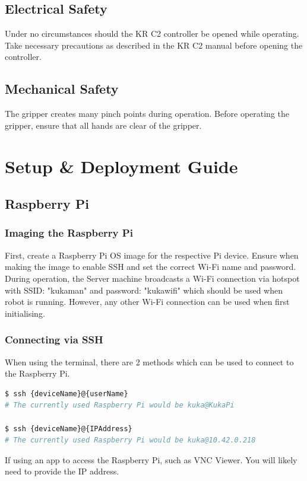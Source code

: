 \documentclass{ol-softwaremanual}
\begin{document}
\subsection{Electrical Safety}
Under no circumstances should the KR C2 controller be opened while operating. Take necessary precautions as described in the KR C2 manual before opening the controller.

\subsection{Mechanical Safety}
The gripper creates many pinch points during operation. Before operating the gripper, ensure that all hands are clear of the gripper.

\section{Setup \& Deployment Guide}
\subsection{Raspberry Pi}

\subsubsection{Imaging the Raspberry Pi}
First, create a Raspberry Pi OS image for the respective Pi device. Ensure when making the image to enable SSH and set the correct Wi-Fi name and password. During operation, the Server machine broadcasts a Wi-Fi connection via hotspot with SSID: "kukaman" and password: "kukawifi" which should be used when robot is running. However, any other Wi-Fi connection can be used when first initialising.

\subsubsection{Connecting via SSH}
When using the terminal, there are 2 methods which can be used to connect to the Raspberry Pi.
\begin{lstlisting}[language=bash, caption="How to SSH into a Raspberry Pi"]
$ ssh {deviceName}@{userName}
# The currently used Raspberry Pi would be kuka@KukaPi

$ ssh {deviceName}@{IPAddress} 
# The currently used Raspberry Pi would be kuka@10.42.0.218
\end{lstlisting}

If using an app to access the Raspberry Pi, such as VNC Viewer. You will likely need to provide the IP address.
\end{document}
